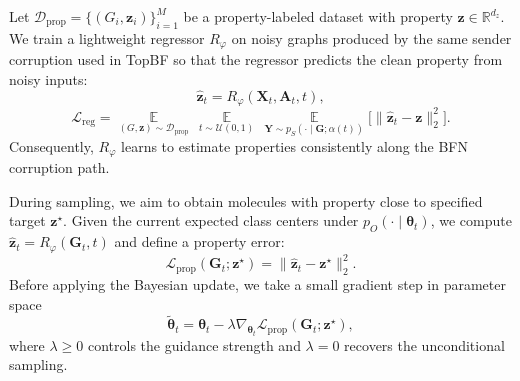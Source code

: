 \documentclass[journal,twoside,web]{ieeecolor}
\begin{document}
Let $\mathcal{D}_{\text{prop}}=\{(G_i,\mathbf{z}_i)\}_{i=1}^{M}$ be a property-labeled dataset with property $\mathbf{z}\in\mathbb{R}^{d_z}$. We train a lightweight regressor $R_{\varphi}$ on noisy graphs produced by the same sender corruption used in TopBF so that the regressor predicts the clean property from noisy inputs:
\begin{equation}
    \hat{\mathbf{z}}_t = R_\varphi(\mathbf{X}_t, \mathbf{A}_t, t),
\end{equation}
\begin{equation}
    \mathcal{L}_{\text{reg}}
    =
    \mathop{\mathbb{E}}\limits_{(G, \mathbf{z}) \sim \mathcal{D}_{\text{prop}}}
    \,
    \mathop{\mathbb{E}}\limits_{t \sim \mathcal{U}(0,1)}
    \,
    \mathop{\mathbb{E}}\limits_{\mathbf{Y} \sim p_S(\cdot \mid \mathbf{G}; \alpha(t))}
    \big[
        \| \hat{\mathbf{z}}_t - \mathbf{z} \|_2^2
    \big].
\end{equation}
Consequently, $R_\varphi$ learns to estimate properties consistently along the BFN corruption path.

During sampling, we aim to obtain molecules with property close to specified target $\mathbf{z}^\star$. Given the current expected class centers under $p_O(\cdot \mid \boldsymbol{\theta}_t)$, we compute $\hat{\mathbf{z}}_t = R_\varphi(\mathbf{G}_t, t)$ and define a property error: 
\begin{equation}
    \mathcal{L}_{\text{prop}}(\mathbf{G}_t; \mathbf{z}^\star)
    =
    \| \hat{\mathbf{z}}_t - \mathbf{z}^\star \|_2^2.
\end{equation}
Before applying the Bayesian update, we take a small gradient step in parameter space
\begin{equation}
    \tilde{\boldsymbol{\theta}}_t
    =
    \boldsymbol{\theta}_t - \lambda \nabla_{\boldsymbol{\theta}_t} \mathcal{L}_{\text{prop}}(\mathbf{G}_t; \mathbf{z}^\star),
\end{equation}
where $\lambda \geq 0$ controls the guidance strength and $\lambda = 0$ recovers the unconditional sampling.
\end{document}
